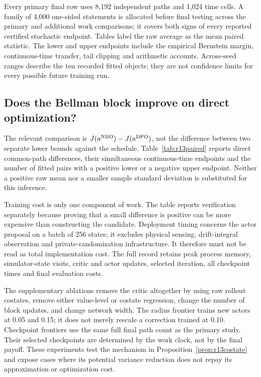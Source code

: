 Every primary final row uses 8,192 independent paths and 1,024 time cells. A family of 4,000 one-sided statements is allocated before final testing across the primary and additional work comparisons; it covers both signs of every reported certified stochastic endpoint. Tables label the raw average as the mean paired statistic. The lower and upper endpoints include the empirical Bernstein margin, continuous-time transfer, tail clipping and arithmetic accounts. Across-seed ranges describe the ten recorded fitted objects; they are not confidence limits for every possible future training run.




\subsection{Does the Bellman block improve on direct optimization?}
The relevant comparison is $J(a^{\rm NBO})-J(a^{\rm DPO})$, not the difference between two separate lower bounds against the schedule. Table~\ref{tab:r13paired} reports direct common-path differences, their simultaneous continuous-time endpoints and the number of fitted pairs with a positive lower or a negative upper endpoint. Neither a positive raw mean nor a smaller sample standard deviation is substituted for this inference.




Training cost is only one component of work. The table reports verification separately because proving that a small difference is positive can be more expensive than constructing the candidate. Deployment timing concerns the actor proposal on a batch of 256 states; it excludes physical sensing, drift-integral observation and private-randomization infrastructure. It therefore must not be read as total implementation cost. The full record retains peak process memory, simulator-state visits, critic and actor updates, selected iteration, all checkpoint times and final evaluation costs.

The supplementary ablations remove the critic altogether by using raw rollout costates, remove either value-level or costate regression, change the number of block updates, and change network width. The radius frontier trains new actors at 0.05 and 0.15; it does not merely rescale a correction trained at 0.10. Checkpoint frontiers use the same full final path count as the primary study. Their selected checkpoints are determined by the work clock, not by the final payoff. These experiments test the mechanism in Proposition~\ref{prop:r13costate} and expose cases where its potential variance reduction does not repay its approximation or optimization cost.

